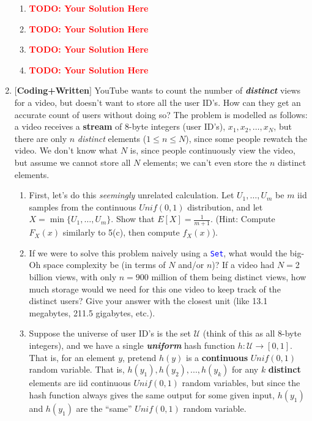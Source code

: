 \documentclass[12pt]{article}
\def\code#1{\textcolor{blue}{\texttt{#1}}}
\def\todo#1{\textcolor{red}{\textbf{#1}}}
\renewcommand{\|}{\mid}
\begin{document}
\begin{enumerate}
\begin{tcolorbox}
\begin{enumerate}
\item \todo{TODO: Your Solution Here}
\item \todo{TODO: Your Solution Here}
\item \todo{TODO: Your Solution Here}
\item \todo{TODO: Your Solution Here}
\end{enumerate}
\end{tcolorbox}

\pagebreak

\item $[$\textbf{Coding+Written}$]$ YouTube wants to count the number of \textbf{\textit{distinct}} views for a video, but doesn't want to store all the user ID's. How can they get an accurate count of users without doing so? The problem is modelled as follows: a video receives a \textbf{stream} of 8-byte integers (user ID's), $x_1,x_2,\dots,x_N$, but there are only $n$ \textit{distinct} elements ($1\le n\le N$), since some people rewatch the video. We don't know what $N$ is, since people continuously view the video, but assume we cannot store all $N$ elements; we can't even store the $n$ distinct elements.
\begin{enumerate}
    \item First, let's do this \textit{seemingly} unrelated calculation. Let $U_1,\dots,U_m$ be $m$ iid samples from the continuous $Unif(0,1)$ distribution, and let $X=\min\{U_1,\dots,U_m\}$. Show that $E[X]=\frac{1}{m+1}$. (Hint: Compute $F_X(x)$ similarly to 5(c), then compute $f_X(x)$).
    \item If we were to solve this problem naively using a \code{Set}, what would the big-Oh space complexity be (in terms of $N$ and/or $n$)? If a video had $N=$2 billion views, with only $n=900$ million of them being distinct views, how much storage would we need for this one video to keep track of the distinct users? Give your answer with the closest unit (like 13.1 megabytes, 211.5 gigabytes, etc.).
    \item Suppose the universe of user ID's is the set $\mathcal{U}$ (think of this as all 8-byte integers), and we have a single \textit{\textbf{uniform}} hash function $h:\mathcal{U}\to[0,1]$. That is, for an element $y$, pretend $h(y)$ is a \textbf{continuous} $Unif(0,1)$ random variable.  That is, $h(y_1),h(y_2),...,h(y_k)$ for any $k$ \textbf{distinct} elements are iid continuous $Unif(0,1)$ random variables, but since the hash function always gives the same output for some given input, $h(y_1)$ and $h(y_1)$ are the ``same'' $Unif(0,1)$ random variable. 


\end{enumerate}
\end{enumerate}
\end{document}
